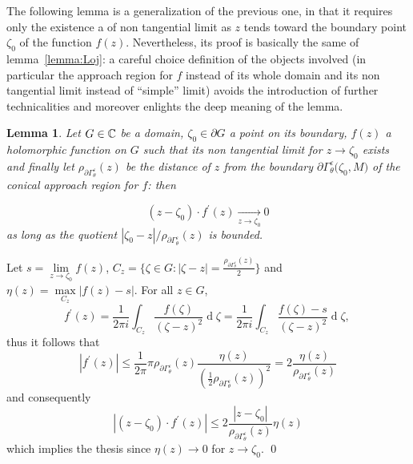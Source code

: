 \documentclass[a4paper,10pt]{article}
\newtheorem{lemma}{Lemma}
\begin{document}
The following lemma is a generalization of the previous one, in that it requires only the existence a of non tangential limit as $z$ tends toward the boundary point $\zeta_0$ of the function $f(z)$. Nevertheless, its proof is basically the same of lemma~\ref{lemma:Loj}: a careful choice definition of the objects involved (in particular the approach region for $f$ instead of its whole domain and its non tangential limit instead of ``simple'' limit) avoids the introduction of further technicalities and moreover enlights the deep meaning of the lemma. 

\begin{lemma}\label{lemma:main} Let $G\in\Bbb C$ be a domain, $\zeta_0 \in\partial G$ a point on its boundary, $f(z)$ a holomorphic function on $G$ such that its non tangential limit for $z \to\zeta_0$ exists and finally let $\rho_{\partial \Gamma_{\theta}^{\varepsilon}}(z)$ be the distance of $z$ from the boundary $\partial \Gamma_{\theta}^{\varepsilon}\big(\zeta_0,M\big)$ of the conical approach region for $f$: then

$$
\left(z-\zeta_0\right) \cdot f^{\prime}(z) \underset{z \to \zeta_0}{\longrightarrow} 0
$$
as long as the quotient $\left|\zeta_0-z\right| / \rho_{\partial \Gamma_{\theta}^{\varepsilon}}(z)$ is bounded.
\end{lemma}
\proof Let $s=\lim\limits_{z \to\zeta_0} f(z)$, $C_z=\bigg\{\!\zeta \in G :| \zeta-z \mid=\frac{\rho_{\partial \Gamma_{\theta}^{\varepsilon}}(z)}{2}\!\bigg\}$ and $\eta(z)=\max\limits_{C_z}|f(z) - s|$. For all $z \in G$,
$$
f^{\prime}(z)=\frac{1}{2 \pi i} \int_{C_z} \frac{f(\zeta)}{(\zeta-z)^2} \operatorname{d}\!\zeta=\frac{1}{2 \pi i} \int_{C_z}\frac{f(\zeta)-s}{(\zeta-z)^2} \operatorname{d}\! \zeta \text {, }
$$
thus it follows that
$$
\left|f^{\prime}(z)\right| \leqslant \frac{1}{2 \pi} \pi \rho_{\partial \Gamma_{\theta}^{\varepsilon}}(z) \frac{\eta(z)}{\left(\frac{1}{2} \rho_{\partial \Gamma_{\theta}^{\varepsilon}}(z)\right)^2}=2 \frac{\eta(z)}{\rho_{\partial \Gamma_{\theta}^{\varepsilon}}(z)}
$$
and consequently
$$
\left|\left(z-\zeta_0\right) \cdot f^{\prime}(z)\right| \leqslant 2 \frac{\left|z-\zeta_0\right|}{\rho_{\partial \Gamma_{\theta}^{\varepsilon}}(z)} \eta(z)
$$
which implies the thesis since $\eta(z) \to 0$ for $z \to \zeta_0$. \qed
\end{document}
